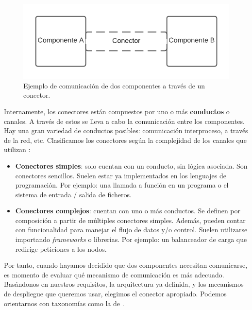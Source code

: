 
\begin{figure}[h!]
  \centering
  \includegraphics[scale=0.78]{03_arquitectura/images/conector}
  \caption{Ejemplo de comunicación de dos componentes a través de un conector.}
  \label{fig:componentesYConectorEjemplo}
\end{figure}

Internamente, los conectores están compuestos por uno o más \textbf{conductos} o canales. A través de estos se lleva a cabo la comunicación entre los componentes. Hay una gran variedad de conductos posibles: comunicación interproceso, a través de la red, etc. Clasificamos los conectores según la complejidad de los canales que utilizan \cite{mehtaTaxonomySoftwareConnectors2000}:

\pagebreak

\begin{itemize}
    \item \textbf{Conectores simples}: solo cuentan con un conducto, sin lógica asociada. Son conectores sencillos. Suelen estar ya implementados en los lenguajes de programación. Por ejemplo: una llamada a función en un programa o el sistema de entrada / salida de ficheros.

    \item \textbf{Conectores complejos}: cuentan con uno o más conductos. Se definen por composición a partir de múltiples conectores simples. Además, pueden contar con funcionalidad para manejar el flujo de datos y/o control. Suelen utilizarse importando \emph{frameworks} o librerias. Por ejemplo: un balanceador de carga que redirige peticiones a los nodos.
\end{itemize}

Por tanto, cuando hayamos decidido que dos componentes necesitan comunicarse, es momento de evaluar qué mecanismo de comunicación es más adecuado. Basándonos en nuestros requisitos, la arquitectura ya definida, y los mecanismos de despliegue que queremos usar, elegimos el conector apropiado. Podemos orientarnos con taxonomías como la de \cite{mehtaTaxonomySoftwareConnectors2000}.

